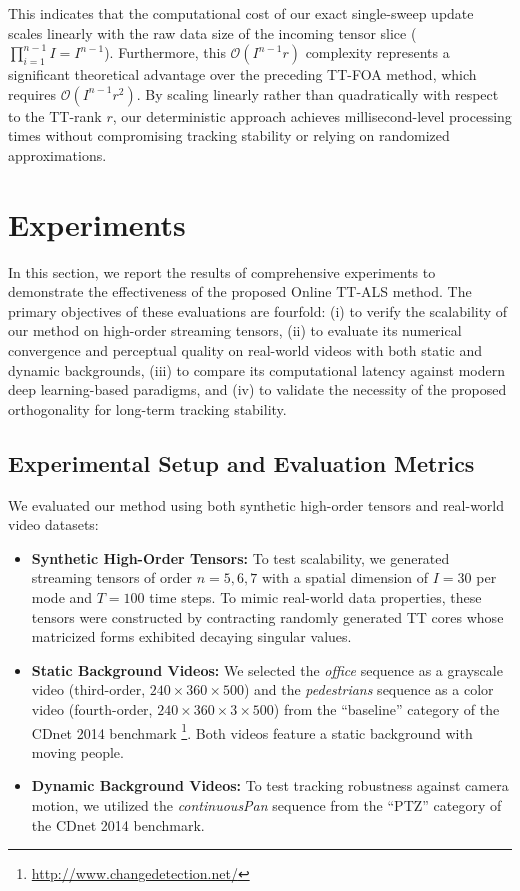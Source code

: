 \documentclass[a4paper, 11pt]{article}
\theoremstyle{plain}
\theoremstyle{definition}
\theoremstyle{remark}
\begin{document}
This indicates that the computational cost of our exact single-sweep update scales linearly with the raw data size of the incoming tensor slice ($\prod_{i=1}^{n-1} I = I^{n-1}$).
Furthermore, this $\mathcal{O}(I^{n-1} r)$ complexity represents a significant theoretical advantage over the preceding TT-FOA method, which requires $\mathcal{O}(I^{n-1} r^2)$.
By scaling linearly rather than quadratically with respect to the TT-rank $r$, our deterministic approach achieves millisecond-level processing times without compromising tracking stability or relying on randomized approximations.

\section{Experiments}
\label{sec:experiments}
In this section, we report the results of comprehensive experiments to demonstrate the effectiveness of the proposed Online TT-ALS method.
The primary objectives of these evaluations are fourfold: (i) to verify the scalability of our method on high-order streaming tensors, (ii) to evaluate its numerical convergence and perceptual quality on real-world videos with both static and dynamic backgrounds, (iii) to compare its computational latency against modern deep learning-based paradigms, and (iv) to validate the necessity of the proposed orthogonality for long-term tracking stability.

\subsection{Experimental Setup and Evaluation Metrics}
We evaluated our method using both synthetic high-order tensors and real-world video datasets:
\begin{itemize}
    \item \textbf{Synthetic High-Order Tensors:} To test scalability, we generated streaming tensors of order $n=5, 6, 7$ with a spatial dimension of $I = 30$ per mode and $T = 100$ time steps. To mimic real-world data properties, these tensors were constructed by contracting randomly generated TT cores whose matricized forms exhibited decaying singular values.
    \item \textbf{Static Background Videos:} We selected the \textit{office} sequence as a grayscale video (third-order, $240 \times 360 \times 500$) and the \textit{pedestrians} sequence as a color video (fourth-order, $240 \times 360 \times 3 \times 500$) from the ``baseline'' category of the CDnet 2014 benchmark \citep{CDNet2014}\footnote{\url{http://www.changedetection.net/}}. Both videos feature a static background with moving people.
    \item \textbf{Dynamic Background Videos:} To test tracking robustness against camera motion, we utilized the \textit{continuousPan} sequence from the ``PTZ'' category of the CDnet 2014 benchmark.
\end{itemize}
\end{document}
